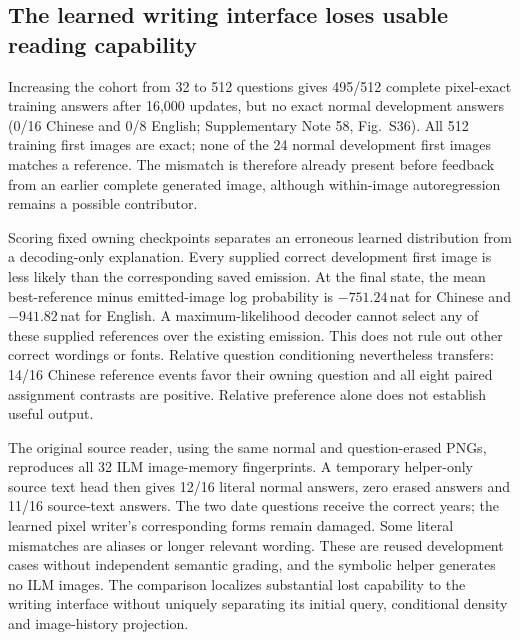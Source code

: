 \documentclass[12pt,a4paper]{article}
\begin{document}
\subsection*{The learned writing interface loses usable reading capability}
Increasing the cohort from 32 to 512 questions gives 495/512 complete
pixel-exact training answers after 16,000 updates, but no exact normal
development answers (0/16 Chinese and 0/8 English; Supplementary Note 58,
Fig.~S36). All 512 training first images are exact; none of the 24 normal
development first images matches a reference. The mismatch is therefore
already present before feedback from an earlier complete generated image,
although within-image autoregression remains a possible contributor.

Scoring fixed owning checkpoints separates an erroneous learned distribution
from a decoding-only explanation. Every supplied correct development first
image is less likely than the corresponding saved emission. At the final
state, the mean best-reference minus emitted-image log probability is
$-751.24$\,nat for Chinese and $-941.82$\,nat for English. A maximum-likelihood
decoder cannot select any of these supplied references over the existing
emission. This does not rule out other correct wordings or fonts. Relative
question conditioning nevertheless transfers: 14/16 Chinese reference events
favor their owning question and all eight paired assignment contrasts are
positive. Relative preference alone does not establish useful output.

The original source reader, using the same normal and question-erased PNGs,
reproduces all 32 ILM image-memory fingerprints. A temporary helper-only
source text head then gives 12/16 literal normal answers, zero erased answers
and 11/16 source-text answers. The two date questions receive the correct
years; the learned pixel writer's corresponding forms remain damaged.
Some literal mismatches are aliases or longer relevant wording. These are
reused development cases without independent semantic grading, and the
symbolic helper generates no ILM images. The comparison localizes substantial
lost capability to the writing interface without uniquely separating its
initial query, conditional density and image-history projection.
\end{document}
